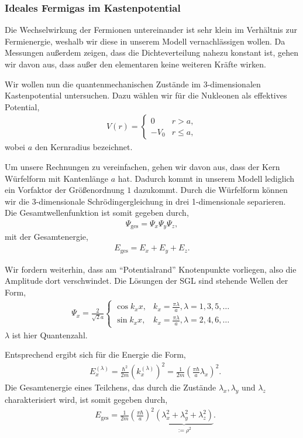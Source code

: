 \subsubsection{Ideales Fermigas im Kastenpotential}

Die Wechselwirkung der Fermionen untereinander ist sehr klein im Verhältnis zur
Fermienergie, weshalb wir diese in unserem Modell vernachlässigen wollen.
Da Messungen außerdem zeigen, dass die Dichteverteilung nahezu konstant
ist, gehen wir davon aus, dass außer den elementaren keine weiteren Kräfte
wirken.

Wir wollen nun die quantenmechanischen Zustände im 3-dimensionalen
Kastenpotential untersuchen. Dazu wählen wir für die Nukleonen als effektives
Potential,
\begin{align*}
V(r) =
\begin{cases}
0 & r > a,\\
-V_0 & r\le a,
\end{cases}
\end{align*}
wobei $a$ den Kernradius bezeichnet.

Um unsere Rechnungen zu vereinfachen, gehen wir davon aus, dass der Kern
Würfelform mit Kantenlänge $a$ hat. Dadurch kommt in unserem
Modell lediglich ein Vorfaktor der Größenordnung $1$ dazukommt. Durch die
Würfelform können wir die 3-dimensionale Schrödingergleichung in drei
1-dimensionale separieren. Die Gesamtwellenfunktion ist somit gegeben durch,
\begin{align*}
\Psi_\text{ges} = \Psi_x\Psi_y\Psi_z,
\end{align*}
mit der Gesamtenergie,
\begin{align*}
E_\text{ges} = E_x + E_y + E_z.
\end{align*}

Wir fordern weiterhin, dass am ``Potentialrand'' Knotenpunkte vorliegen, also
die Amplitude dort verschwindet. Die Lösungen der SGL sind stehende Wellen
der Form,
\begin{align*}
\Psi_x = \frac{2}{\sqrt{2}a}\begin{cases}
\cos k_x x, & k_x = \frac{\pi \lambda}{a},  \lambda=1,3,5,\ldots\\
\sin k_x x, & k_x = \frac{\pi \lambda}{a},  \lambda=2,4,6,\ldots 
\end{cases}
\end{align*}
$\lambda$ ist hier Quantenzahl.

Entsprechend ergibt sich für die Energie die Form,
\begin{align*}
&E_x^{(\lambda)} = \frac{\hbar^2}{2m}\left(k_x^{(\lambda)}\right)^2 =
\frac{1}{2m}\left(\frac{\pi\hbar}{a}\lambda_x\right)^2.
\end{align*}
Die Gesamtenergie eines Teilchens, das durch die Zustände $\lambda_x,\lambda_y$
und $\lambda_z$ charakterisiert wird, ist somit gegeben durch,
\begin{align*}
&E_\text{ges} =
\frac{1}{2m}\left(\frac{\pi\hbar}{a}\right)^2\underbrace{\left(\lambda_x^2 +
\lambda_y^2+ \lambda_z^2\right)}_{:=\rho^2}.
\end{align*}

